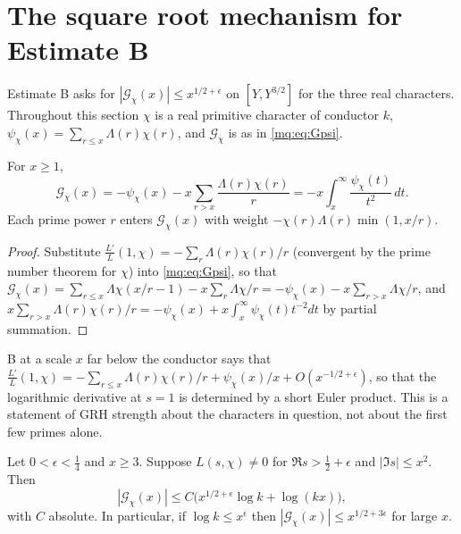 \section{The square root mechanism for Estimate B}\label{mq:sec:sqrt}

Estimate B asks for $|\mathcal G_\chi(x)|\le x^{1/2+\epsilon}$ on $[Y,Y^{3/2}]$ for the three real characters. Throughout this section $\chi$ is a real primitive character of conductor $k$, $\psi_\chi(x)=\sum_{r\le x}\Lambda(r)\chi(r)$, and $\mathcal G_\chi$ is as in \eqref{mq:eq:Gpsi}.

\begin{proposition}\label{mq:prop:tail}
For $x\ge1$,
\[
\mathcal G_\chi(x)=-\psi_\chi(x)-x\sum_{r>x}\frac{\Lambda(r)\chi(r)}r=-x\int_x^\infty\frac{\psi_\chi(t)}{t^2}\,dt.
\]
Each prime power $r$ enters $\mathcal G_\chi(x)$ with weight $-\chi(r)\Lambda(r)\min(1,x/r)$.
\end{proposition}

\begin{proof}
Substitute $\frac{L'}L(1,\chi)=-\sum_r\Lambda(r)\chi(r)/r$ (convergent by the prime number theorem for $\chi$) into \eqref{mq:eq:Gpsi}, so that $\mathcal G_\chi(x)=\sum_{r\le x}\Lambda\chi(x/r-1)-x\sum_r\Lambda\chi/r=-\psi_\chi(x)-x\sum_{r>x}\Lambda\chi/r$, and $x\sum_{r>x}\Lambda(r)\chi(r)/r=-\psi_\chi(x)+x\int_x^\infty\psi_\chi(t)t^{-2}dt$ by partial summation.
\end{proof}

B at a scale $x$ far below the conductor says that $\frac{L'}{L}(1,\chi)=-\sum_{r\le x}\Lambda(r)\chi(r)/r+\psi_\chi(x)/x+O(x^{-1/2+\epsilon})$, so that the logarithmic derivative at $s=1$ is determined by a short Euler product. This is a statement of GRH strength about the characters in question, not about the first few primes alone.

\begin{proposition}\label{mq:prop:rectangle}
Let $0<\epsilon<\frac14$ and $x\ge3$. Suppose $L(s,\chi)\ne0$ for $\Re s>\frac12+\epsilon$ and $|\Im s|\le x^2$. Then
\[
|\mathcal G_\chi(x)|\le C\big(x^{1/2+\epsilon}\log k+\log(kx)\big),
\]
with $C$ absolute. In particular, if $\log k\le x^\epsilon$ then $|\mathcal G_\chi(x)|\le x^{1/2+3\epsilon}$ for large $x$.
\end{proposition}

